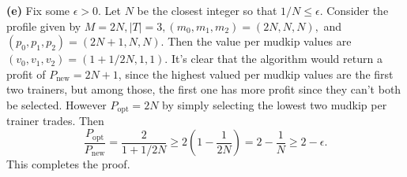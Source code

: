 \documentclass[11pt,letterpaper]{article}
\begin{document}
\begin{solution}
    \textbf{(e)} Fix some $\epsilon>0$. Let $N$ be the closest integer so that $1 /N\leq \epsilon$. Consider the profile given by $M=2N, |T|=3, (m_0, m_1, m_2)=(2N, N, N),$ and $(p_0, p_1, p_2)=(2N+1, N, N)$. Then the value per mudkip values are $(v_0, v_1, v_2)=(1+1 /2N, 1, 1)$. It's clear that the algorithm would return a profit of $P_{\mathrm{new}} = 2N+1$, since the highest valued per mudkip values are the first two trainers, but among those, the first one has more profit since they can't both be selected. However $P_{\mathrm{opt}}=2N$ by simply selecting the lowest two mudkip per trainer trades. Then
    \[
        \frac{P_{\mathrm{opt}}}{P_{\mathrm{new}}}=\frac{2}{1+1 /2N} \geq 2\left(1-\frac{1}{2N}\right) = 2-\frac{1}{N}\geq 2-\epsilon
    .\] 
    This completes the proof.
\end{solution}
\end{document}
